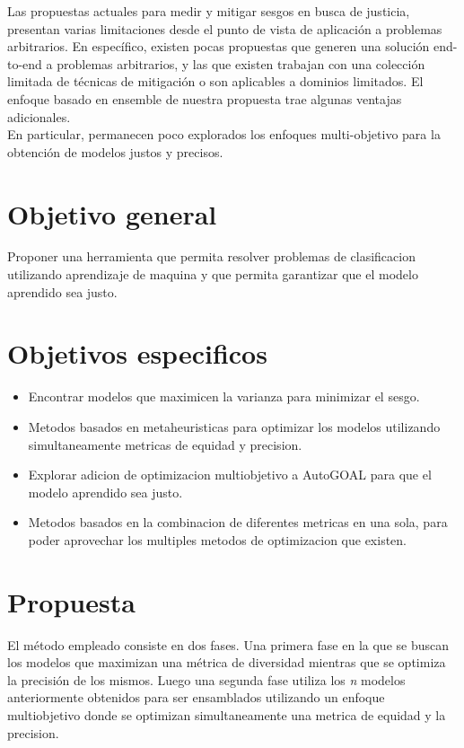 \documentclass[runningheads,a4paper]{llncs}
\begin{document}
	Las propuestas actuales para medir y mitigar sesgos en busca de justicia, presentan varias limitaciones desde el punto de vista de aplicación a problemas arbitrarios. En específico, existen pocas propuestas que generen una solución end-to-end a problemas arbitrarios, y las que existen trabajan con una colección limitada de técnicas de mitigación o son aplicables a dominios limitados. El enfoque basado en ensemble de nuestra propuesta trae algunas ventajas adicionales.\\
	En particular, permanecen poco explorados los enfoques multi-objetivo para la obtención de modelos justos y precisos.
	
	\section*{Objetivo general}
	
	Proponer una herramienta que permita resolver problemas de clasificacion utilizando aprendizaje de maquina y que permita garantizar que el modelo aprendido sea justo.
	
	\section*{Objetivos especificos}
	
	\begin{itemize}
		\item Encontrar modelos que maximicen la varianza para minimizar el sesgo.
		\item Metodos basados en metaheuristicas para optimizar los modelos utilizando simultaneamente metricas de equidad y precision.
		\item Explorar adicion de optimizacion multiobjetivo a AutoGOAL para que el modelo aprendido sea justo.
		\item Metodos basados en la combinacion de diferentes metricas en una sola, para poder aprovechar los multiples metodos de optimizacion que existen.
	\end{itemize}
	
	\section*{Propuesta}\label{chapter:proposal}
	
	El método empleado consiste en dos fases. Una primera fase en la que se buscan los modelos que
	maximizan una métrica de diversidad mientras que se optimiza la precisión de los mismos. Luego una
	segunda fase utiliza los \emph{n} modelos anteriormente obtenidos para ser ensamblados utilizando un
	enfoque multiobjetivo donde se optimizan simultaneamente una metrica de equidad y la precision.
	
\end{document}
